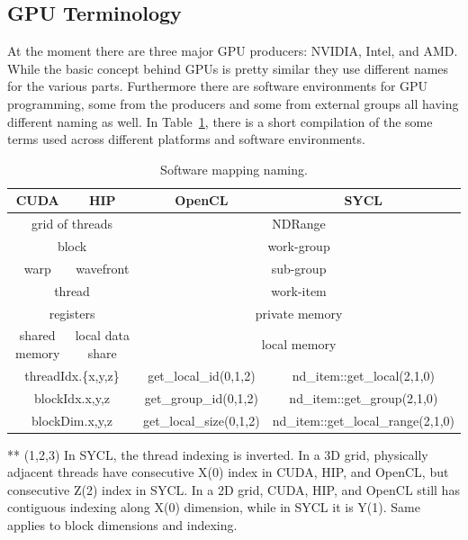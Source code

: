 

\subsection{GPU Terminology}


\par
At the moment there are three major GPU producers: NVIDIA, Intel, and AMD.
While the basic concept behind GPUs is pretty similar they use different names for the various parts.
Furthermore there are software environments for GPU programming, some from the producers and some from external groups all having different naming as well.
In Table~\ref{tbl:gpu_terminology_cuda_hip_opencl_sycl}, there is a short compilation of the some terms used across different platforms and software environments.


\begin{table}[h]
\begin{center}
\begin{threeparttable}\caption{Software mapping naming.}\label{tbl:gpu_terminology_cuda_hip_opencl_sycl}
\begin{tabular}{ |c@{\quad}|c@{\quad}|c@{\quad}|c@{\quad}| } 
\hline
\textbf{CUDA} & \textbf{HIP} & \textbf{OpenCL} & \textbf{SYCL} \\
\hline
\multicolumn{2}{|c|}{grid of threads} & \multicolumn{2}{c|}{NDRange} \\ \hline
\multicolumn{2}{|c|}{block} & \multicolumn{2}{c|}{work-group} \\ \hline
warp & wavefront & \multicolumn{2}{c|}{sub-group} \\ \hline
\multicolumn{2}{|c|}{thread} & \multicolumn{2}{|c|}{work-item} \\ \hline
\multicolumn{2}{|c|}{registers} & \multicolumn{2}{|c|}{private memory} \\ \hline
shared memory & local data share & \multicolumn{2}{|c|}{local memory} \\ \hline
\multicolumn{2}{|c|}{threadIdx.\{x,y,z\}} & get\_local\_id({0,1,2}) & nd\_item::get\_local({2,1,0})\tnote{**} \\ \hline
\multicolumn{2}{|c|}{blockIdx.{x,y,z}} & get\_group\_id({0,1,2}) & nd\_item::get\_group({2,1,0})\tnote{**} \\ \hline
\multicolumn{2}{|c|}{blockDim.{x,y,z}} & get\_local\_size({0,1,2}) & nd\_item::get\_local\_range({2,1,0})\tnote{**} \\
\hline
\end{tabular}
\begin{tablenotes}
\item[**] (1,2,3) In SYCL, the thread indexing is inverted. In a 3D grid, physically adjacent threads have consecutive X(0) index in CUDA, HIP, and OpenCL, but consecutive Z(2) index in SYCL. In a 2D grid, CUDA, HIP, and OpenCL still has contiguous indexing along X(0) dimension, while in SYCL it is Y(1). Same applies to block dimensions and indexing.
\end{tablenotes}
\end{threeparttable}
\end{center}
\end{table}

